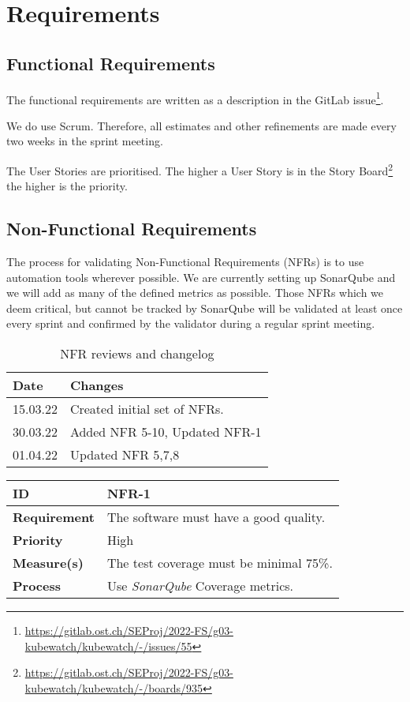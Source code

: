 \chapter{Requirements}

\section{Functional Requirements}
The functional requirements are written as a description in the GitLab issue\footnote{\url{https://gitlab.ost.ch/SEProj/2022-FS/g03-kubewatch/kubewatch/-/issues/55}}.

We do use Scrum.
Therefore, all estimates and other refinements are made every two weeks in the sprint meeting.

The User Stories are prioritised.
The higher a User Story is in the Story Board\footnote{\url{https://gitlab.ost.ch/SEProj/2022-FS/g03-kubewatch/kubewatch/-/boards/935}} the higher is the priority.


\section{Non-Functional Requirements}
The process for validating Non-Functional Requirements (NFRs) is to use automation tools wherever possible. We are currently setting up SonarQube and we will add as many of the defined metrics as possible. Those NFRs which we deem critical, but cannot be tracked by SonarQube will be validated at least once every sprint and confirmed by the validator during a regular sprint meeting.

\begin{table}[h!]
    \centering
      \caption{\label{tab:nfr-review}NFR reviews and changelog}
      \begin{tabular}{ | l | l | }
        \hline
        \textbf{Date} & \textbf{Changes} \\
        \hline
        15.03.22 & Created initial set of NFRs. \\
        \hline
        30.03.22 & Added NFR 5-10, Updated NFR-1 \\
        \hline
        01.04.22 & Updated NFR 5,7,8 \\
        \hline
      \end{tabular}
    \end{table}

\begin{center}
\begin{tabular}{ | m{8em} | m{25em}| } 
 \hline
 \textbf{ID} & NFR-1\\ 
 \hline
 \textbf{Requirement} & The software must have a good quality. \\
 \hline
 \textbf{Priority} & High\\
 \hline
 \textbf{Measure(s)} & The test coverage must be minimal 75\%.\\
 \hline
 \textbf{Process} & Use \textit{SonarQube} Coverage metrics. \\
 \hline
\end{tabular}
\end{center}

